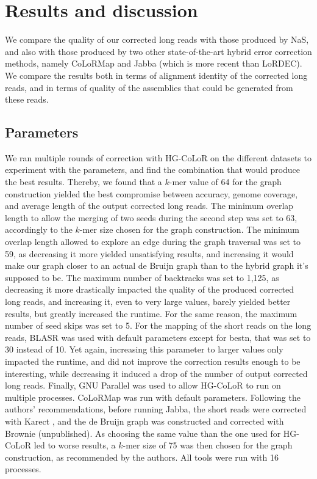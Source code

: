 \documentclass[long, final]{jobim2017}
\begin{document}
\section{Results and discussion}
\label{sec:results}

We compare the quality of our corrected long reads with those produced by NaS, and also with those produced by two other state-of-the-art hybrid error correction methods, namely CoLoRMap and Jabba (which is more recent than LoRDEC). We compare the results both in terms of alignment identity of the corrected long reads, and in terms of quality of the assemblies that could be generated from these reads.

\subsection{Parameters}

We ran multiple rounds of correction with HG-CoLoR on the different datasets to experiment with the parameters, and find the combination that would produce the best results. Thereby, we found that a $k$-mer value of 64 for the graph construction yielded the best compromise between accuracy, genome coverage, and average length of the output corrected long reads. The minimum overlap length to allow the merging of two seeds during the second step was set to 63, accordingly to the $k$-mer size chosen for the graph construction. The minimum overlap length allowed to explore an edge during the graph traversal was set to 59, as decreasing it more yielded unsatisfying results, and increasing it would make our graph closer to an actual de Bruijn graph than to the hybrid graph it's supposed to be. The maximum number of backtracks was set to 1,125, as decreasing it more drastically impacted the quality of the produced corrected long reads, and increasing it, even to very large values, barely yielded better results, but greatly increased the runtime. For the same reason, the maximum number of seed skips was set to 5. For the mapping of the short reads on the long reads, BLASR was used with default parameters except for bestn, that was set to 30 instead of 10. Yet again, increasing this parameter to larger values only impacted the runtime, and did not improve the correction results enough to be interesting, while decreasing it induced a drop of the number of output corrected long reads. Finally, GNU Parallel \cite{Tange2011} was used to allow HG-CoLoR to run on multiple processes. CoLoRMap was run with default parameters. Following the authors' recommendations, before running Jabba, the short reads were corrected with Karect \cite{Allam2015}, and the de Bruijn graph was constructed and corrected with Brownie (unpublished). As choosing the same value than the one used for HG-CoLoR led to worse results, a $k$-mer size of 75 was then chosen for the graph construction, as recommended by the authors.
All tools were run with 16 processes.
\end{document}
